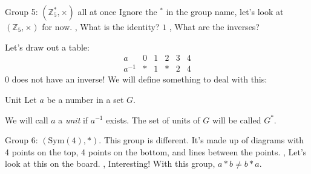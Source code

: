 \begin{namedframe}{Group 5: $(\mathbb{Z}_{5}^*, \times)$ all at once}
	Ignore the $^*$ in the group name, let's look at $(\mathbb{Z}_{5}, \times)$ for now.
	\sep
	What is the identity? \pause $1$
	\sep
	What are the inverses?

	Let's draw out a table:
	\begin{equation*}
		\begin{array}{c|ccccc}
			a      & 0 & 1  & 2 & 3 & 4\\\hline
			a^{-1} & * & 1  & * & 2 & 4
		\end{array}
	\end{equation*}
	$0$ does not have an inverse! We will define something to deal with this:
	\begin{block}{Unit}
		Let $a$ be a number in a set $G$.

		We will call $a$ a \emph{unit} if $a^{-1}$ exists. The set of units of $G$ will be called $G^*$.
	\end{block}
\end{namedframe}
\begin{namedframe}{Group 6: $(\mathrm{Sym}(4), *)$.}
	This group is different. It's made up of diagrams with 4 points on the top, 4 points on the bottom, and lines between the points.
	\sep
	Let's look at this on the board.
	\sep
	Interesting! With this group, $a * b \neq b * a$.
\end{namedframe}
